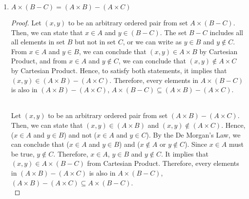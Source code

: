 \documentclass[12pt]{article}
\begin{document}
\begin{enumerate}
\begin{enumerate}
\begin{proof}
			Let $(x,y)$ to be an arbitrary ordered pair from set  $(A\times B) \cap (A \times C)$, $(x,y) \in (A\times B) \cap (A \times C) $. By definition of intersection, we can conclude that $(x,y) \in A \times B$ and $(x,y) \in A\times C$. $x$, in this case, is in A, and $y$ is in $B$ and $y$ is in $C$, $y \in B$ and $y \in C$. By definition of union, we can say that $y \in B \cup C$. Putting $(x,y)$ into ordered pair, we can conclude $(x,y) \in A \times (B \cup C)$ from Cartesian Product. Therefore, every elements in $(A\times B) \cap (A \times C)$ is also in $A\times (B\cap C)$, $ (A\times B) \cap (A \times C) \subseteq A\times (B\cap C) $.\\
		
			  $A\times (B\cap C)$ and $(A\times B) \cap (A \times C)$ are mutually subset of each other, which implies that $A\times (B\cap C) = (A\times B) \cap (A \times C)$.
				\end{proof}
		
		\item $A \times (B - C) = (A\times B) - (A\times C)$\\
		\begin{proof}
				Let $(x,y)$ to be an arbitrary ordered pair from set $A \times (B - C)$. Then, we can state that $x \in A$ and $y \in (B - C)$. The set $B-C$ includes all all elements in set $B$ but not in set $C$, or we can write as $y \in B$ and $y \notin C$. From $x \in A$ and $y \in B$, we can conclude that $(x,y) \in A \times B$ by Cartesian Product, and from $x \in A$ and $y \notin C$, we can conclude that $(x,y) \notin A \times C$ by Cartesian Product. Hence, to satisfy both statements, it implies that $ (x,y) \in (A\times B) -(A\times C)$. Therefore, every elements in $A \times (B - C)$ is also in $(A\times B) - (A\times C)$, $ A \times (B - C) \subseteq (A\times B) - (A\times C)$.\\\
				
				Let $(x,y)$ to be an arbitrary ordered pair from set $ (A\times B) - (A\times C)$. Then, we can state that $(x,y) \in  (A\times B)$ and $(x,y) \notin (A\times C)$. Hence, ($x \in A$ and $y \in B$) and not ($x \in A$ and $y \in C$).	By the De Morgan's Law, we can conclude that ($x \in A$ and $y \in B$) and  ($x \notin A$ or $y \notin C$). Since $x \in A$ must be true, $y \notin C$. Therefore, $x \in A$, $y \in B$ and $y \notin C$. It implies that $(x,y) \in A \times (B-C)$ from Cartesian Product. Therefore, every elements in $(A\times B) - (A\times C)$ is also in $A \times (B - C)$, $ (A\times B) - (A\times C)\subseteq A \times (B - C)$.\\
				

\end{proof}
\end{enumerate}
\end{enumerate}
\end{document}
